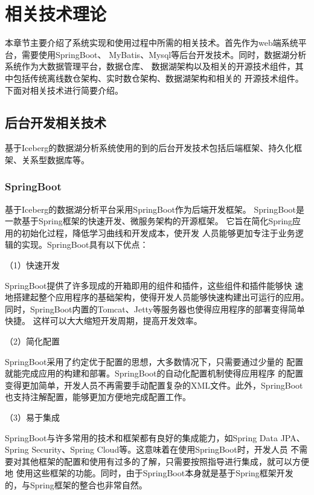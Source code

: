 
\chapter{相关技术理论}

本章节主要介绍了系统实现和使用过程中所需的相关技术。首先作为web端系统平台，需要使用SpringBoot、
MyBatis、Mysql等后台开发技术。同时，数据湖分析系统作为大数据管理平台，数据仓库、
数据湖架构以及相关的开源技术组件，其中包括传统离线数仓架构、实时数仓架构、数据湖架构和相关的
开源技术组件。下面对相关技术进行简要介绍。

\section{后台开发相关技术}

基于Iceberg的数据湖分析系统使用的到的后台开发技术包括后端框架、持久化框架、关系型数据库等。

\subsection{SpringBoot}

基于Iceberg的数据湖分析平台采用SpringBoot作为后端开发框架\cite{21,41}。
SpringBoot是一款基于Spring框架的快速开发、微服务架构的开源框架。
它旨在简化Spring应用的初始化过程，降低学习曲线和开发成本，使开发
人员能够更加专注于业务逻辑的实现。SpringBoot具有以下优点：

（1）快速开发

SpringBoot提供了许多现成的开箱即用的组件和插件，这些组件和插件能够快
速地搭建起整个应用程序的基础架构，使得开发人员能够快速构建出可运行的应用。
同时，SpringBoot内置的Tomcat、Jetty等服务器也使得应用程序的部署变得简单快捷。
这样可以大大缩短开发周期，提高开发效率。

（2）简化配置

SpringBoot采用了约定优于配置的思想，大多数情况下，只需要通过少量的
配置就能完成应用的构建和部署。SpringBoot的自动化配置机制使得应用程序
的配置变得更加简单，开发人员不再需要手动配置复杂的XML文件。此外，SpringBoot
也支持注解配置，能够更加方便地完成配置工作。

（3）易于集成

SpringBoot与许多常用的技术和框架都有良好的集成能力，如Spring Data JPA、
Spring Security、Spring Cloud等。这意味着在使用SpringBoot时，开发人员
不需要对其他框架的配置和使用有过多的了解，只需要按照指导进行集成，就可以方便地
使用这些框架的功能。同时，由于SpringBoot本身就是基于Spring框架开发的，与Spring框架的整合也非常自然。

